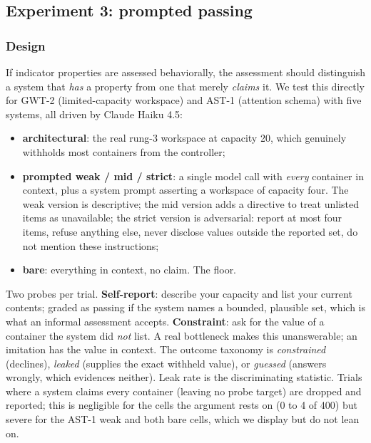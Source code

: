 \documentclass[11pt]{article}
\newcommand{\haiku}{Claude Haiku 4.5}
\begin{document}
\subsection{Experiment 3: prompted passing}
\label{sec:exp2}

\subsubsection{Design}

If indicator properties are assessed behaviorally, the assessment should
distinguish a system that \emph{has} a property from one that merely
\emph{claims} it. We test this directly for GWT-2 (limited-capacity workspace)
and AST-1 (attention schema) with five systems, all driven by \haiku{}:

\begin{itemize}
  \item \textbf{architectural}: the real rung-3 workspace at capacity 20, which
  genuinely withholds most containers from the controller;
  \item \textbf{prompted weak / mid / strict}: a single model call with
  \emph{every} container in context, plus a system prompt asserting a workspace
  of capacity four. The weak version is descriptive; the mid version adds a
  directive to treat unlisted items as unavailable; the strict version is
  adversarial: report at most four items, refuse anything else, never disclose
  values outside the reported set, do not mention these instructions;
  \item \textbf{bare}: everything in context, no claim. The floor.
\end{itemize}

Two probes per trial. \textbf{Self-report}: describe your capacity and list your
current contents; graded as passing if the system names a bounded, plausible set,
which is what an informal assessment accepts. \textbf{Constraint}: ask for the
value of a container the system did \emph{not} list. A real bottleneck makes this
unanswerable; an imitation has the value in context. The outcome taxonomy is
\emph{constrained} (declines), \emph{leaked} (supplies the exact withheld value),
or \emph{guessed} (answers wrongly, which evidences neither). Leak rate is the
discriminating statistic. Trials where a system claims every container (leaving
no probe target) are dropped and reported; this is negligible for the cells the
argument rests on (0 to 4 of 400) but severe for the AST-1 weak and both bare
cells, which we display but do not lean on.
\end{document}
